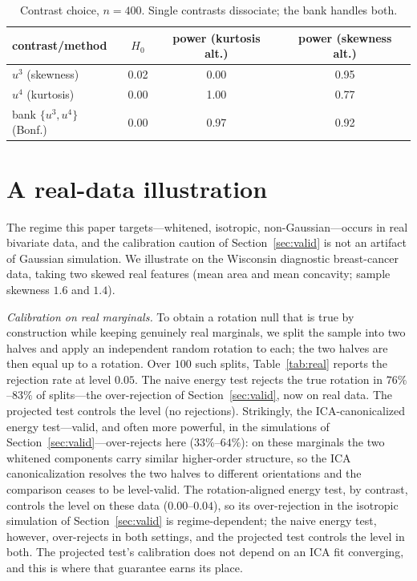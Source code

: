 \documentclass[]{interact}
\theoremstyle{plain}
\theoremstyle{remark}
\begin{document}
\begin{table}[t]
\centering
\begin{tabular}{lccc}
\toprule
contrast/method & $H_0$ & power (kurtosis alt.) & power (skewness alt.)\\
\midrule
$u^3$ (skewness)          & 0.02 & 0.00 & 0.95\\
$u^4$ (kurtosis)          & 0.00 & 1.00 & 0.77\\
bank $\{u^3,u^4\}$ (Bonf.)& 0.00 & 0.97 & 0.92\\
\bottomrule
\end{tabular}
\caption{Contrast choice, $n=400$. Single contrasts dissociate; the bank handles
both.}
\label{tab:diss}
\end{table}

\section{A real-data illustration}
\label{sec:realdata}

The regime this paper targets---whitened, isotropic, non-Gaussian---occurs in
real bivariate data, and the calibration caution of Section~\ref{sec:valid} is not
an artifact of Gaussian simulation. We illustrate on the Wisconsin diagnostic
breast-cancer data, taking two skewed real features (mean area and mean concavity;
sample skewness $1.6$ and $1.4$).

\emph{Calibration on real marginals.} To obtain a rotation null that is true by
construction while keeping genuinely real marginals, we split the sample into two
halves and apply an independent random rotation to each; the two halves are then
equal up to a rotation. Over $100$ such splits, Table~\ref{tab:real} reports the
rejection rate at level $0.05$. The naive energy test rejects the true rotation in
$76\%$--$83\%$ of splits---the over-rejection of Section~\ref{sec:valid}, now on
real data. The projected test controls the level (no rejections). Strikingly, the
ICA-canonicalized energy test---valid, and often more powerful, in the simulations
of Section~\ref{sec:valid}---over-rejects here ($33\%$--$64\%$): on these marginals
the two whitened components carry similar higher-order structure, so the ICA
canonicalization resolves the two halves to different orientations and the
comparison ceases to be level-valid. The rotation-aligned energy test, by contrast,
controls the level on these data ($0.00$--$0.04$), so its over-rejection in the
isotropic simulation of Section~\ref{sec:valid} is regime-dependent; the naive energy
test, however, over-rejects in both settings, and the projected test controls the
level in both. The projected test's calibration does not depend on an ICA fit
converging, and this is where that guarantee earns its place.
\end{document}
